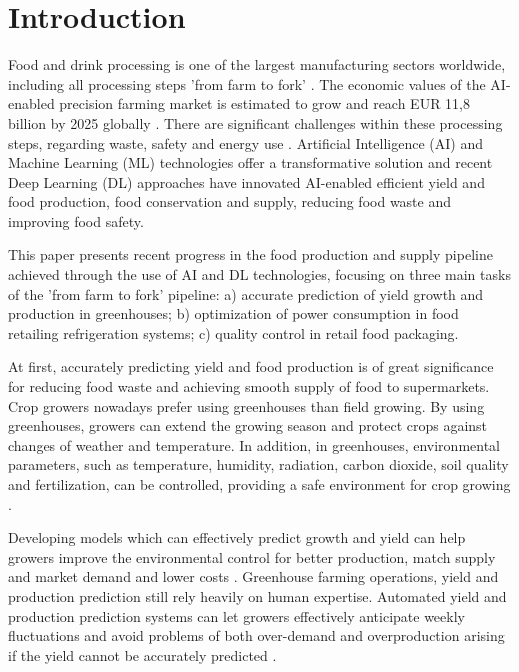 \documentclass[journal,article,accept,moreauthors,pdftex]{Definitions/mdpi}
\begin{document}
\section{Introduction}
Food and drink processing is one of the largest manufacturing sectors worldwide, including all processing steps 'from farm to fork' \cite{ref105}. The economic values of the AI-enabled precision farming market is estimated to grow and reach EUR 11,8 billion by 2025 globally \cite{ref104}.
 There are significant challenges within these processing steps, regarding waste, safety and energy use \cite{ref62}. Artificial Intelligence (AI) and Machine Learning (ML) technologies offer a transformative solution and recent Deep Learning (DL) approaches have innovated AI-enabled efficient yield and food production, food conservation and supply, reducing food waste and improving food safety. 

This paper presents  recent progress in the food production and supply pipeline
achieved through the use of AI and DL technologies, focusing on three main tasks of the 'from farm to fork' pipeline:  a) accurate prediction of yield growth and production in greenhouses; b) optimization of power consumption in food retailing refrigeration systems; c) quality control in retail food packaging.

At first, accurately predicting yield and food production is of great significance for reducing food waste and achieving smooth supply of food to supermarkets.  Crop growers nowadays prefer using greenhouses than field growing. By using greenhouses, growers can extend the growing
season and protect crops against changes of weather and  temperature.  In addition, in greenhouses, environmental parameters, such as temperature,  humidity, radiation, carbon dioxide, soil quality and fertilization, can be controlled, providing a safe environment for crop growing \cite{ref74, ref108}.

Developing models which
can effectively predict growth and yield can help
growers improve the environmental control for
better production, match supply and market
demand and lower costs \cite{ref70, ref71}.
Greenhouse farming operations, yield and production prediction still rely heavily on human expertise. Automated yield and production prediction systems can let growers effectively anticipate weekly fluctuations and avoid problems of both over-demand and overproduction arising if the yield cannot be accurately predicted \cite{ref57, ref58}.
\end{document}
